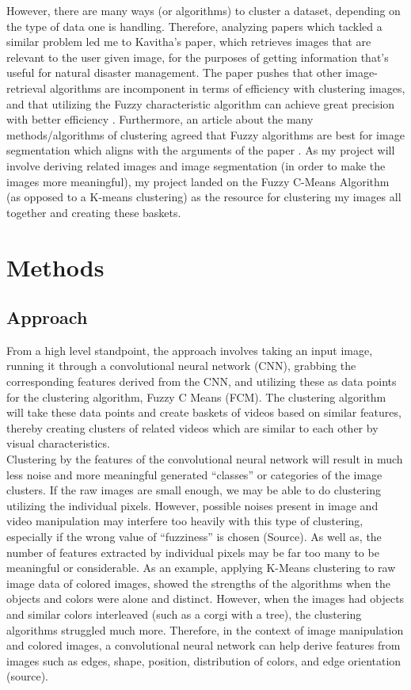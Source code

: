 \documentclass[10pt,twocolumn]{article}
\begin{document}
\indent However, there are many ways (or algorithms) to cluster a dataset, depending on the type of data one is handling. Therefore, analyzing papers which tackled a similar problem led me to Kavitha’s paper, which retrieves images that are relevant to the user given image, for the purposes of getting information that’s useful for natural disaster management. The paper pushes that other image-retrieval algorithms are incomponent in terms of efficiency with clustering images, and that utilizing the Fuzzy characteristic algorithm can achieve great precision with better efficiency \cite{Kavitha2020}. Furthermore, an article about the many methods/algorithms of clustering agreed that Fuzzy algorithms are best for image segmentation which aligns with the arguments of the paper \cite{PrasadClustering}. As my project will involve deriving related images and image segmentation (in order to make the images more meaningful), my project landed on the Fuzzy C-Means Algorithm (as opposed to a K-means clustering) as the resource for clustering my images all together and creating these baskets.

\section {Methods}

\subsection {Approach}

\indent From a high level standpoint, the approach involves taking an input image, running it through a convolutional neural network (CNN), grabbing the corresponding features derived from the CNN, and utilizing these as data points for the clustering algorithm, Fuzzy C Means (FCM). The clustering algorithm will take these data points and create baskets of videos based on similar features, thereby creating clusters of related videos which are similar to each other by visual characteristics. 
\\
\indent 
Clustering by the features of the convolutional neural network will result in much less noise and more meaningful generated “classes” or categories of the image clusters. If the raw images are small enough, we may be able to do clustering utilizing the individual pixels. However, possible noises present in image and video manipulation may interfere too heavily with this type of clustering, especially if the wrong value of “fuzziness” is chosen (Source). As well as, the number of features extracted by individual pixels may be far too many to be meaningful or considerable. As an example, applying K-Means clustering to raw image data of colored images, showed the strengths of the algorithms when the objects and colors were alone and distinct. However, when the images had objects and similar colors interleaved (such as a corgi with a tree), the clustering algorithms struggled much more. Therefore, in the context of image manipulation and colored images, a convolutional neural network can help derive features from images such as edges, shape, position, distribution of colors, and edge orientation (source).
\end{document}
